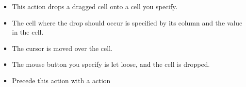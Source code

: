 
\begin{itemize}
\item This action drops a dragged cell onto a cell you specify.
\item The cell where the drop should occur is specified by its column and the value in the cell.
\item The cursor is moved over the cell.
\item The mouse button you specify is let loose, and the cell is dropped. 
\item Precede this action with a  action
\end{itemize}


